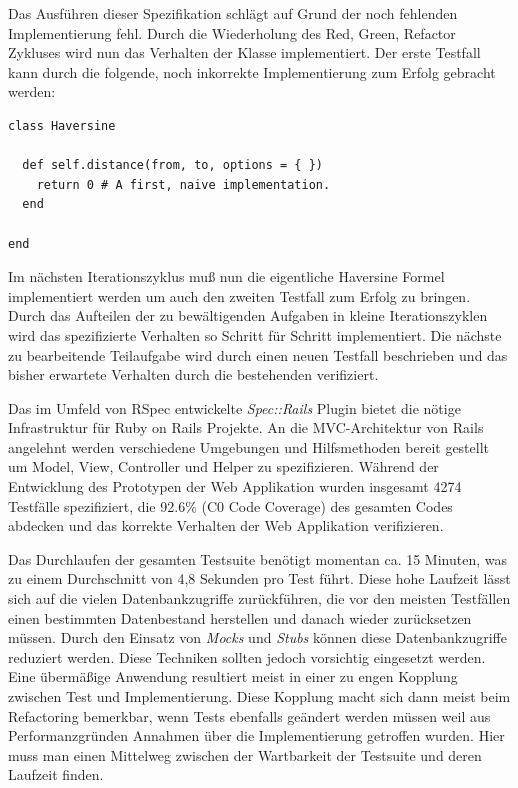 Das Ausführen dieser Spezifikation schlägt auf Grund der noch
fehlenden Implementierung fehl. Durch die Wiederholung des Red, Green,
Refactor Zykluses wird nun das Verhalten der Klasse implementiert. Der
erste Testfall kann durch die folgende, noch inkorrekte
Implementierung zum Erfolg gebracht werden:

\begin{lstlisting}
class Haversine

  def self.distance(from, to, options = { })
    return 0 # A first, naive implementation.
  end

end
\end{lstlisting}

Im nächsten Iterationszyklus muß nun die eigentliche Haversine Formel
\cite{wiki:haversine} implementiert werden um auch den zweiten
Testfall zum Erfolg zu bringen. Durch das Aufteilen der zu
bewältigenden Aufgaben in kleine Iterationszyklen wird das
spezifizierte Verhalten so Schritt für Schritt implementiert. Die
nächste zu bearbeitende Teilaufgabe wird durch einen neuen Testfall
beschrieben und das bisher erwartete Verhalten durch die bestehenden
verifiziert.

Das im Umfeld von RSpec entwickelte \textit{Spec::Rails} Plugin bietet
die nötige Infrastruktur für Ruby on Rails Projekte. An die
MVC-Architektur von Rails angelehnt werden verschiedene Umgebungen und
Hilfsmethoden bereit gestellt um Model, View, Controller und Helper zu
spezifizieren. Während der Entwicklung des Prototypen der Web
Applikation wurden insgesamt 4274 Testfälle spezifiziert, die 92.6\%
(C0 Code Coverage) des gesamten Codes abdecken und das korrekte
Verhalten der Web Applikation verifizieren.

Das Durchlaufen der gesamten Testsuite benötigt momentan ca. 15
Minuten, was zu einem Durchschnitt von 4,8 Sekunden pro Test
führt. Diese hohe Laufzeit lässt sich auf die vielen Datenbankzugriffe
zurückführen, die vor den meisten Testfällen einen bestimmten
Datenbestand herstellen und danach wieder zurücksetzen müssen. Durch
den Einsatz von \textit{Mocks} und \textit{Stubs} können diese
Datenbankzugriffe reduziert werden. Diese Techniken sollten jedoch
vorsichtig eingesetzt werden. Eine übermäßige Anwendung resultiert
meist in einer zu engen Kopplung zwischen Test und
Implementierung. Diese Kopplung macht sich dann meist beim Refactoring
bemerkbar, wenn Tests ebenfalls geändert werden müssen weil aus
Performanzgründen Annahmen über die Implementierung getroffen
wurden. Hier muss man einen Mittelweg zwischen der Wartbarkeit der
Testsuite und deren Laufzeit finden.

